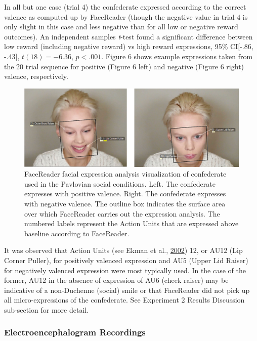 \documentclass[]{elsarticle} %
\begin{document}
In all but one case (trial 4) the confederate expressed according to the
correct valence as computed up by FaceReader (though the negative value
in trial 4 is only slight in this case and less negative than for all
low or negative reward outcomes). An independent samples \emph{t}-test
found a significant difference between low reward (including negative
reward) vs high reward expressions, 95\% CI{[}-.86, -.43{]},
\(t(18) = -6.36\), \(p<.001\). Figure 6 shows example expressions taken
from the 20 trial sequence for positive (Figure 6 left) and negative
(Figure 6 right) valence, respectively.

\begin{figure}

{\centering \includegraphics[width=0.8\linewidth]{figure7} 

}

\caption{FaceReader facial expression analysis visualization of confederate used in the Pavlovian social conditions. Left. The confederate expresses with positive valence. Right. The confederate expresses with negative valence. The outline box indicates the surface area over which FaceReader carries out the expression analysis. The numbered labels represent the Action Units that are expressed above baseline according to FaceReader.}\label{fig:figure6}
\end{figure}

It was observed that Action Units (see Ekman et al.,
\protect\hyperlink{ref-ekman_facial_2002}{2002}) 12, or AU12 (Lip Corner
Puller), for positively valenced expression and AU5 (Upper Lid Raiser)
for negatively valenced expression were most typically used. In the case
of the former, AU12 in the absence of expression of AU6 (cheek raiser)
may be indicative of a non-Duchenne (social) smile or that FaceReader
did not pick up all micro-expressions of the confederate. See Experiment
2 Results Discussion sub-section for more detail.

\hypertarget{electroencephalogram-recordings}{%
\subsubsection{Electroencephalogram
Recordings}\label{electroencephalogram-recordings}}
\end{document}
